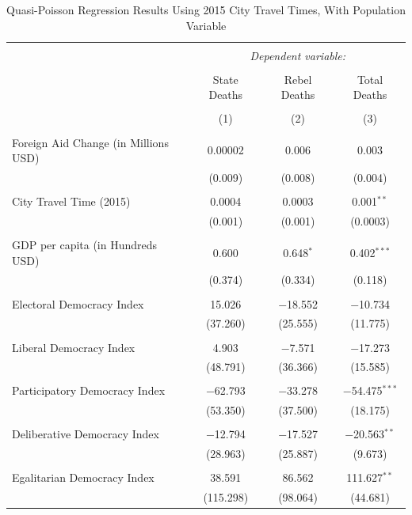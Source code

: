 \documentclass[12pt, letterpaper]{article}
\begin{document}
\begin{table}[!htbp] \centering 
	\caption{Quasi-Poisson Regression Results Using 2015 City Travel Times, With Population Variable} 
	\begin{tabular}{@{\extracolsep{5pt}}lccc} 
\\[-1.8ex]\hline 
\hline \\[-1.8ex] 
& \multicolumn{3}{c}{\textit{Dependent variable:}} \\ 
\cline{2-4} 
\\[-1.8ex] & State Deaths & Rebel Deaths & Total Deaths \\ 
\\[-1.8ex] & (1) & (2) & (3)\\ 
\hline \\[-1.8ex] 
Foreign Aid Change (in Millions USD) & 0.00002 & 0.006 & 0.003 \\ 
& (0.009) & (0.008) & (0.004) \\ 
& & & \\ 
City Travel Time (2015) & 0.0004 & 0.0003 & 0.001$^{**}$ \\ 
& (0.001) & (0.001) & (0.0003) \\ 
& & & \\ 
GDP per capita (in Hundreds USD) & 0.600 & 0.648$^{*}$ & 0.402$^{***}$ \\ 
& (0.374) & (0.334) & (0.118) \\ 
& & & \\ 
Electoral Democracy Index & 15.026 & $-$18.552 & $-$10.734 \\ 
& (37.260) & (25.555) & (11.775) \\ 
& & & \\ 
Liberal Democracy Index & 4.903 & $-$7.571 & $-$17.273 \\ 
& (48.791) & (36.366) & (15.585) \\ 
& & & \\ 
Participatory Democracy Index & $-$62.793 & $-$33.278 & $-$54.475$^{***}$ \\ 
& (53.350) & (37.500) & (18.175) \\ 
& & & \\ 
Deliberative Democracy Index & $-$12.794 & $-$17.527 & $-$20.563$^{**}$ \\ 
& (28.963) & (25.887) & (9.673) \\ 
& & & \\ 
Egalitarian Democracy Index & 38.591 & 86.562 & 111.627$^{**}$ \\ 
& (115.298) & (98.064) & (44.681) \\ 

\end{tabular}
\end{table}
\end{document}
